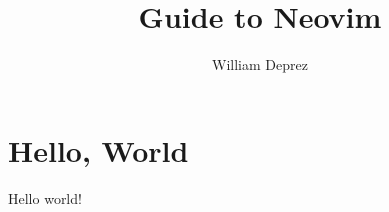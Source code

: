 \documentclass{article}
\title{Guide to Neovim}
\author{William Deprez}
\begin{document}
\maketitle
\tableofcontents
\section{Hello, World}
Hello world!
\end{document}
